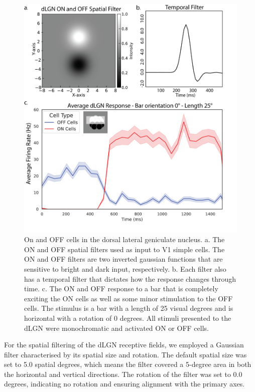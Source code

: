 \documentclass[12pt]{article}
\begin{document}
\begin{figure}[H]
  \centering
  \includegraphics[width=1.0 \textwidth]{adjusted_figures/lgn_response_fig.png}
  \caption{On and OFF cells in the dorsal lateral geniculate nucleus. a. The ON and OFF spatial filters used as input to V1 simple cells. The ON and OFF filters are two inverted gaussian functions that are sensitive to bright and dark input, respectively. b. Each filter also has a temporal filter that dictates how the response changes through time. c. The ON and OFF response to a bar that is completely exciting the ON cells as well as some minor stimulation to the OFF cells. The stimulus is a bar with a length of 25 visual degrees and is horizontal with a rotation of 0 degrees. All stimuli presented to the dLGN were monochromatic and activated ON or OFF cells.}
  \label{fig:LIF_connectivity}
\end{figure}

For the spatial filtering of the dLGN receptive fields, we employed a Gaussian filter characterised by its spatial size and rotation. The default spatial size was set to 5.0 spatial degrees, which means the filter covered a 5-degree area in both the horizontal and vertical directions. The rotation of the filter was set to 0.0 degrees, indicating no rotation and ensuring alignment with the primary axes.
\end{document}
